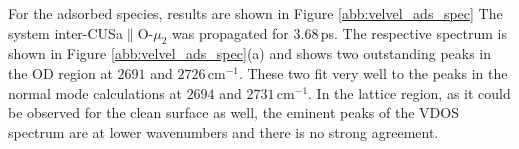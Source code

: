 \documentclass[11pt,DIV=13,BCOR=5mm,a4paper,headinclude]{scrbook}
\begin{document}
For the adsorbed species, results are shown in Figure \ref{abb:velvel_ads_spec}
The system inter-CUSa$\parallel$O-$\mu_2$ was propagated for $3.68\,$ps.
The respective spectrum is shown in Figure \ref{abb:velvel_ads_spec}(a) and shows two outstanding peaks in the OD region at $2691$ and $2726\,$cm$^{-1}$.
These two fit very well to the peaks in the normal mode calculations at $2694$ and $2731\,$cm$^{-1}$.
In the lattice region, as it could be observed for the clean surface as well, the eminent peaks of the VDOS spectrum are at lower wavenumbers and there is no strong agreement.
\begin{figure}[!h]
    \centering

\end{figure}
\end{document}
